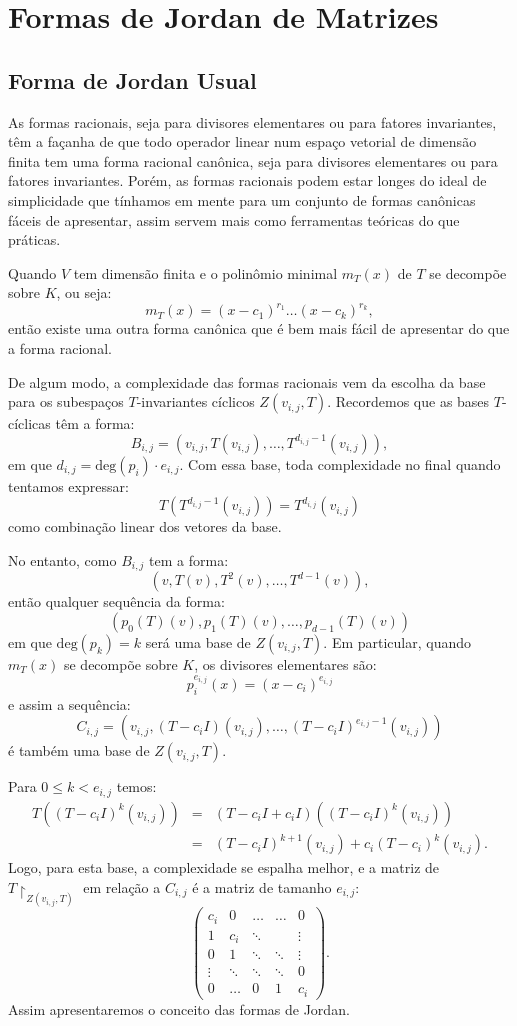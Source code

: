 \documentclass[11pt,twoside,a4paper]{book}
\begin{document}
\section{Formas de Jordan de Matrizes}

\subsection{Forma de Jordan Usual}

As formas racionais, seja para divisores elementares ou para fatores invariantes, têm a façanha de que todo operador linear num espaço vetorial de dimensão finita tem uma forma racional canônica, seja para divisores elementares ou para fatores invariantes. Porém, as formas racionais podem estar longes do ideal de simplicidade que tínhamos em mente para um conjunto de formas canônicas fáceis de apresentar, assim servem mais como ferramentas teóricas do que práticas.

\medskip
\noindent
Quando $V$ tem dimensão finita e o polinômio minimal $m_T(x)$ de $T$ se decompõe sobre $K$, ou seja:
\[
m_T(x)=(x-c_1)^{r_1}\dots(x-c_k)^{r_k},
\]
então existe uma outra forma canônica que é bem mais fácil de apresentar do que a forma racional.

\medskip
\noindent
De algum modo, a complexidade das formas racionais vem da escolha da base para os subespaços $T$-invariantes cíclicos $Z(v_{i,j},T)$. Recordemos que as bases $T$-cíclicas
têm a forma:
\[
B_{i,j}=(v_{i,j},T(v_{i,j}),\dots,T^{d_{i,j}-1}(v_{i,j})),
\]
em que $d_{i,j}=\mathrm{deg}(p_i)\cdot e_{i,j}$. Com essa base, toda complexidade no final quando tentamos expressar:
\[
T(T^{d_{i,j}-1}(v_{i,j}))=T^{d_{i,j}}(v_{i,j})
\]
como combinação linear dos vetores da base.

\medskip
\noindent
No entanto, como $B_{i,j}$ tem a forma:
\[
(v,T(v),T^2(v),\dots,T^{d-1}(v)),
\]
então qualquer sequência da forma:
\[
(p_0(T)(v),p_1(T)(v),\dots,p_{d-1}(T)(v))
\]
em que $\mathrm{deg}(p_k)=k$ será uma base de $Z(v_{i,j},T)$. Em particular, quando $m_T(x)$ se decompõe sobre $K$, os divisores elementares são:
\[
p_i^{e_{i,j}}(x)=(x-c_i)^{e_{i,j}}
\]
e assim a sequência:
\[
C_{i,j}=(v_{i,j},(T-c_iI)(v_{i,j}),\dots,(T-c_iI)^{e_{i,j}-1}(v_{i,j}))
\]
é também uma base de $Z(v_{i,j},T)$.

\medskip
\noindent
Para $0\leq k<e_{i,j}$ temos:
\[
\begin{array}{rcl}
T((T-c_iI)^k(v_{i,j}))
&=&(T-c_iI+c_iI)((T-c_iI)^k(v_{i,j}))\\
&=&(T-c_iI)^{k+1}(v_{i,j})+c_i(T-c_i)^k(v_{i,j}).
\end{array}
\]
Logo, para esta base, a complexidade se espalha melhor, e a matriz de $T\upharpoonright_{Z(v_{i,j},T)}$ em relação a $C_{i,j}$ é a matriz de tamanho $e_{i,j}$:
\[
\begin{pmatrix}
c_i&0&\ldots&\ldots&0\\1&c_i&\ddots&&\vdots\\0&1&\ddots&\ddots&\vdots\\\vdots&\ddots&\ddots&\ddots&0\\0&\ldots&0&1&c_i
\end{pmatrix}.
\]
Assim apresentaremos o conceito das formas de Jordan.
\end{document}
